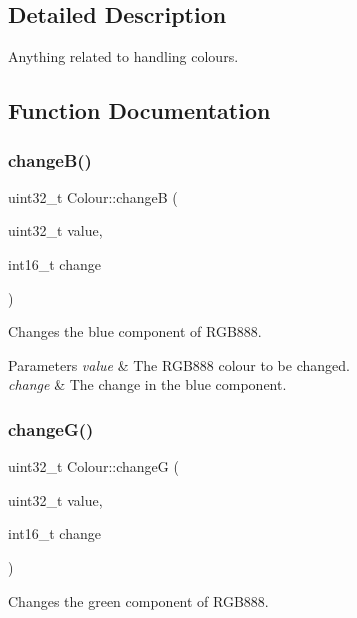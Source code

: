 \subsection{Detailed Description}
Anything related to handling colours. 

\subsection{Function Documentation}
\mbox{\label{namespaceColour_a8e854e6a656f9d7c53dbd46eccba1816}} 
\subsubsection{\texorpdfstring{change\+B()}{changeB()}}
{\footnotesize\ttfamily uint32\+\_\+t Colour\+::changeB (\begin{DoxyParamCaption}\item[{uint32\+\_\+t}]{value,  }\item[{int16\+\_\+t}]{change }\end{DoxyParamCaption})}



Changes the blue component of R\+G\+B888. 


\begin{DoxyParams}{Parameters}
{\em value} & The R\+G\+B888 colour to be changed. \\
\hline
{\em change} & The change in the blue component. \\
\hline
\end{DoxyParams}
\mbox{\label{namespaceColour_a944d058dabcf1f24a5093a04656efc60}} 
\subsubsection{\texorpdfstring{change\+G()}{changeG()}}
{\footnotesize\ttfamily uint32\+\_\+t Colour\+::changeG (\begin{DoxyParamCaption}\item[{uint32\+\_\+t}]{value,  }\item[{int16\+\_\+t}]{change }\end{DoxyParamCaption})}



Changes the green component of R\+G\+B888. 


